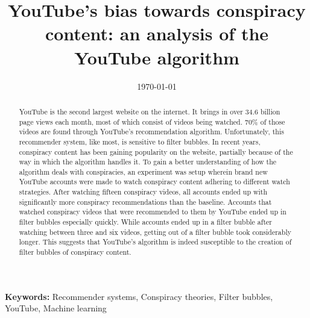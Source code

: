 \documentclass{uva-inf-article}
\title{YouTube's bias towards conspiracy content: an analysis of the YouTube algorithm}
\date{\today}
\begin{document}
\maketitle

\begin{abstract}
    YouTube is the second largest website on the internet. It brings in over 34.6 billion page views each month,
    most of which consist of videos being watched. 70\% of those videos are found through YouTube's 
    recommendation algorithm. Unfortunately, this recommender system, like most, is sensitive to filter bubbles.
    In recent years, conspiracy content has been gaining popularity on the website, partially because of the way
    in which the algorithm handles it. To gain a better understanding of how the algorithm deals with
    conspiracies, an experiment was setup wherein brand new YouTube accounts were made to watch conspiracy
    content adhering to different watch strategies. After watching fifteen conspiracy videos, all accounts ended
    up with significantly more conspiracy recommendations than the baseline. Accounts that watched conspiracy 
    videos that were recommended to them by YouTube ended up in filter bubbles especially quickly. While
    accounts ended up in a filter bubble after watching between three and six videos, getting out of a filter
    bubble took considerably longer. This suggests that YouTube's algorithm is indeed susceptible to the
    creation of filter bubbles of conspiracy content. 
\end{abstract}

{\bf Keywords:} Recommender systems, Conspiracy theories, Filter bubbles, YouTube, Machine learning

\linenumbers















\newpage



\newpage
\nolinenumbers

 

\newpage


\end{document}
